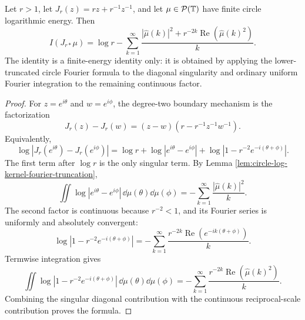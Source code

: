 \begin{lemma}\label{lem:joukowsky-boundary-kernel-diagonalization}
Let \(r>1\), let \(J_r(z)=rz+r^{-1}z^{-1}\), and let
\(\mu\in\mathcal P(\mathbb{T})\) have finite circle logarithmic energy.  Then
\[
I(J_{r\ast}\mu)
=
\log r-\sum_{k=1}^{\infty}
\frac{|\widehat\mu(k)|^2+r^{-2k}\operatorname{Re}(\widehat\mu(k)^2)}{k}.
\]
The identity is a finite-energy identity only: it is obtained by applying
the lower-truncated circle Fourier formula to the diagonal singularity and
ordinary uniform Fourier integration to the remaining continuous factor.
\end{lemma}

\begin{proof}
For \(z=e^{i\theta}\) and \(w=e^{i\phi}\), the degree-two boundary
mechanism is the factorization
\[
J_r(z)-J_r(w)
=(z-w)\left(r-r^{-1}z^{-1}w^{-1}\right).
\]
Equivalently,
\[
\log|J_r(e^{i\theta})-J_r(e^{i\phi})|
=\log r+\log|e^{i\theta}-e^{i\phi}|
 +\log|1-r^{-2}e^{-i(\theta+\phi)}|.
\]
The first term after \(\log r\) is the only singular term.  By Lemma
\ref{lem:circle-log-kernel-fourier-truncation},
\[
\iint\log|e^{i\theta}-e^{i\phi}|\,\dd\mu(\theta)\dd\mu(\phi)
=-\sum_{k=1}^{\infty}\frac{|\widehat\mu(k)|^2}{k}.
\]
The second factor is continuous because \(r^{-2}<1\), and its Fourier
series is uniformly and absolutely convergent:
\[
\log|1-r^{-2}e^{-i(\theta+\phi)}|
=-\sum_{k=1}^{\infty}
\frac{r^{-2k}\operatorname{Re}(e^{-ik(\theta+\phi)})}{k}.
\]
Termwise integration gives
\[
\iint\log|1-r^{-2}e^{-i(\theta+\phi)}|
\,\dd\mu(\theta)\dd\mu(\phi)
=-\sum_{k=1}^{\infty}
\frac{r^{-2k}\operatorname{Re}(\widehat\mu(k)^2)}{k}.
\]
Combining the singular diagonal contribution with the continuous
reciprocal-scale contribution proves the formula.
\end{proof}

